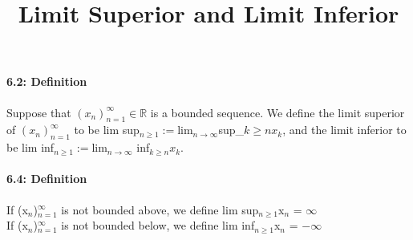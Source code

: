 \documentclass[10pt,letter]{article}
\begin{document}
\title{Limit Superior and Limit Inferior}
\paragraph{6.2: Definition}
Suppose that $(x_n)_{n=1}^\infty \in \mathbb{R}$ is a bounded sequence. We define the limit superior of $(x_n)_{n=1}^\infty$ to be lim sup$_{n\geq 1} := $lim$_{n\rightarrow\infty} $sup_${k\geq n} x_k$, and the limit inferior to be lim inf$_{n\geq 1} := $lim$_{n\rightarrow\infty}$ inf$_{k\geq n} x_k$.

\paragraph{6.4: Definition}
If (x$_n$)$_{n=1}^\infty$ is not bounded above, we define lim sup$_{n\geq 1}$x$_n$ = $\infty$\\
If (x$_n$)$_{n=1}^\infty$ is not bounded below, we define lim inf$_{n\geq 1}$x$_n$ = $-\infty$
\end{document}

